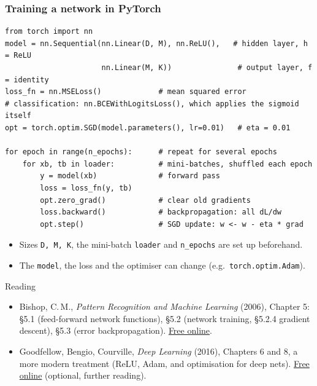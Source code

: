 \documentclass[10pt]{beamer}
\begin{document}
\begin{frame}[fragile]
\frametitle{Training a network in PyTorch}

\begin{lstlisting}
from torch import nn
model = nn.Sequential(nn.Linear(D, M), nn.ReLU(),   # hidden layer, h = ReLU
                      nn.Linear(M, K))               # output layer, f = identity
loss_fn = nn.MSELoss()             # mean squared error
# classification: nn.BCEWithLogitsLoss(), which applies the sigmoid itself
opt = torch.optim.SGD(model.parameters(), lr=0.01)   # eta = 0.01

for epoch in range(n_epochs):      # repeat for several epochs
    for xb, tb in loader:          # mini-batches, shuffled each epoch
        y = model(xb)              # forward pass
        loss = loss_fn(y, tb)
        opt.zero_grad()            # clear old gradients
        loss.backward()            # backpropagation: all dL/dw
        opt.step()                 # SGD update: w <- w - eta * grad
\end{lstlisting}

\begin{itemize}
\item Sizes \texttt{D, M, K}, the mini-batch \texttt{loader} and
  \texttt{n\_epochs} are set up beforehand.
\item[$\Rightarrow$] The \texttt{model}, the loss and the optimiser can change (e.g.\
  \texttt{torch.optim.Adam}).
\end{itemize}

\end{frame}
\begin{titledslide}{Reading}

  \begin{itemize}
  \item Bishop, C.\,M., \emph{Pattern Recognition and Machine Learning}
    (2006), Chapter 5:
    \S5.1 (feed-forward network functions), \S5.2
    (network training, \S5.2.4 gradient descent), \S5.3 (error
    backpropagation).
    \href{https://www.microsoft.com/en-us/research/uploads/prod/2006/01/Bishop-Pattern-Recognition-and-Machine-Learning-2006.pdf}{Free
    online}.
  \item Goodfellow, Bengio, Courville, \emph{Deep Learning} (2016), Chapters
    6 and 8, a more modern treatment (ReLU, Adam, and optimisation for deep
    nets). \href{https://www.deeplearningbook.org/}{Free online} (optional,
    further reading).
  \end{itemize}

\end{titledslide}
\end{document}
